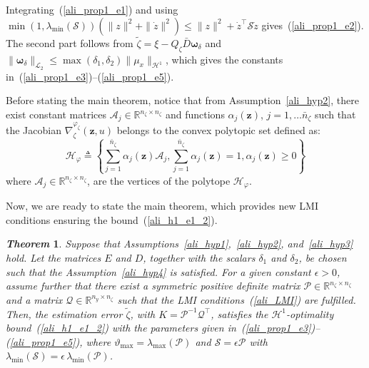\documentclass{ifacconf}
\def\eqref#1{(\ref{#1})}
\newtheorem{theorem}{\it \textbf{Theorem}}%
\begin{document}
\begin{pf}
Integrating~\eqref{ali_prop1_e1} and using
$\min(1,\lambda_{\min}(\mathcal{S}))(\|z\|^2+\|\dot z\|^2)\leq
\|z\|^2+\dot z^\top\mathcal{S}\dot z$
gives~\eqref{ali_prop1_e2}. The second part follows from
$\tilde{\zeta}=\xi-Q_{\zeta}\bar D\bm{\omega}_{\delta}$ and
$\|\bm{\omega}_{\delta}\|_{\mathcal L_2}\leq
\max(\delta_1,\delta_2)\|\mu_x\|_{\mathcal H^1}$, which gives the constants in~\eqref{ali_prop1_e3}--\eqref{ali_prop1_e5}.
\end{pf}
%
Before stating the main theorem, notice that from Assumption~\ref{ali_hyp2}, there exist constant matrices $\mathcal{A}_{j} \in \mathbb{R}^{n_\zeta \times n_\zeta}$ and functions $\alpha_{j}(\bm{z})$, $j=1,\dots \bar{n}_{\zeta}$ such that the Jacobian $\nabla^{\varphi_{\zeta}}_{\zeta}(\bm{z},u)$ belongs to the convex polytopic set defined as:
\begin{equation}\label{varphi_zeta}
\mathcal{H}_{\varphi} \triangleq \left\{ \sum^{\bar{n}_{\zeta}}_{j=1}\alpha_{j} (\bm{z}) \mathcal{A}_{j}, \sum^{\bar{n}_{\zeta}}_{j=1}\alpha_{j}(\bm{z}) =1, \alpha_{j}(\bm{z}) \geq0 \right\}
\end{equation}
where $\mathcal{A}_{j} \in \mathbb{R}^{n_\zeta \times n_\zeta}$, are the vertices of the polytope $\mathcal{H}_{\varphi}$. 

Now, we are ready to state the main theorem, which provides new LMI conditions ensuring the bound~\eqref{ali_h1_e1_2}.

\begin{theorem}\label{ali_thm}
Suppose that Assumptions~\ref{ali_hyp1},~\ref{ali_hyp2}, and~\ref{ali_hyp3} hold. Let the matrices $E$ and $D$, together with the scalars $\delta_1$ and $\delta_2$, be chosen such that the Assumption~\ref{ali_hyp4} is satisfied. For a given constant $\epsilon > 0$, assume further that there exist a symmetric positive definite matrix $\mathcal{P} \in \mathbb{R}^{n_{\zeta}\times n_{\zeta}}$ and a matrix $\mathcal{Q} \in \mathbb{R}^{n_{y}\times n_{\zeta}}$ such that the LMI conditions~\eqref{ali_LMI} are fulfilled. Then, the estimation error $\tilde{\zeta}$, with $K = \mathcal{P}^{-1}\mathcal{Q}^{\top}$, satisfies the $\mathcal{H}^{1}$-optimality bound~\eqref{ali_h1_e1_2} with the parameters given in~\eqref{ali_prop1_e3}--\eqref{ali_prop1_e5}, where $\vartheta_{\max} = \lambda_{\max}\!\left( \mathcal{P} \right)$ and $\mathcal{S} = \epsilon \mathcal{P}$ with $\lambda_{\min}\!\left( \mathcal{S} \right)= \epsilon\, \lambda_{\min}\!\left( \mathcal{P} \right)$.
\end{theorem}
\end{document}
